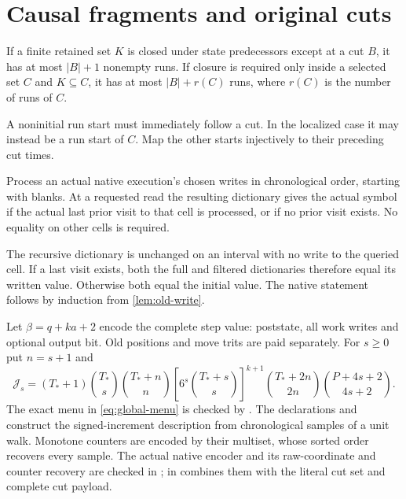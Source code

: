 \section{Causal fragments and original cuts}\label{sec:fragments}

\begin{lemma}\label{lem:fragments}
If a finite retained set $K$ is closed under state predecessors except at a
cut $B$, it has at most $|B|+1$ nonempty runs. If closure is required only
inside a selected set $C$ and $K\subseteq C$, it has at most
$|B|+r(C)$ runs, where $r(C)$ is the number of runs of $C$.
\end{lemma}
\begin{outline}
A noninitial run start must immediately follow a cut. In the localized
case it may instead be a run start of $C$. Map the other starts injectively
to their preceding cut times.
\end{outline}

\begin{lemma}\label{lem:current-version}
Process an actual native execution's chosen writes in chronological order,
starting with blanks. At a requested read the resulting dictionary gives
the actual symbol if the actual last prior visit to that cell is processed,
or if no prior visit exists. No equality on other cells is required.
\end{lemma}
\begin{outline}
The recursive dictionary is unchanged on an interval with no write to the
queried cell. If a last visit exists, both the full and filtered dictionaries
therefore equal its written value. Otherwise both equal the initial value.
The native statement follows by induction from \cref{lem:old-write}.
\end{outline}

Let $\beta=q+ka+2$ encode the complete step value: poststate, all work writes
and optional output bit. Old positions and move trits are paid separately.
For $s\ge0$ put $n=s+1$ and
\begin{equation}\label{eq:global-menu}
 \mathcal J_s=(T_*+1)\binom{T_*}{s}\binom{T_*+n}{n}
 \left[6^s\binom{T_*+s}{s}\right]^{k+1}
 \binom{T_*+2n}{2n}\binom{P+4s+2}{4s+2}.
\end{equation}
The exact menu in \cref{eq:global-menu} is checked by
.
The declarations  and 
construct the signed-increment description from chronological samples of a
unit walk. Monotone counters are encoded by their multiset, whose sorted
order recovers every sample. The actual native encoder and its raw-coordinate
and counter recovery are checked in ;
 in 
combines them with the literal cut set and complete cut payload.

